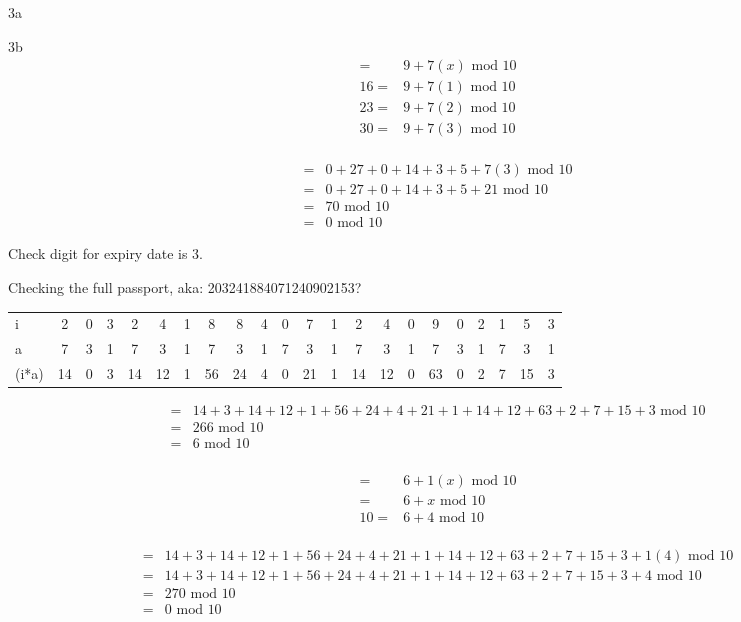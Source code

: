\begin{question}{3a}
\begin{question}{3b}
\begin{align*}
=& 9 + 7(x)\textrm{ mod } 10\\
16=& 9 + 7(1)\textrm{ mod } 10\\
23=& 9 + 7(2)\textrm{ mod } 10\\
30=& 9 + 7(3)\textrm{ mod } 10\\
\end{align*}

\begin{align*}
=& 0  + 27 + 0  + 14 + 3  + 5 +7(3) \textrm{ mod } 10\\
=& 0  + 27 + 0  + 14 + 3  + 5 + 21 \textrm{ mod } 10\\
=& 70 \textrm{ mod } 10\\
=& 0 \textrm{ mod } 10
\end{align*}

Check digit for expiry date is 3.



Checking the full passport, aka: 203241884071240902153?

\begin{tabular}{l|ccccccccccccccccccccc}
\hline
i     &  2  & 0  & 3  & 2  & 4  & 1  & 8  & 8  & 4  & 0  & 7  & 1  & 2  & 4  & 0  & 9  & 0  & 2  & 1  & 5  & 3 \\
a     & 7   & 3  & 1  & 7  & 3  & 1  & 7  & 3  & 1  & 7  & 3  & 1  & 7  & 3  & 1  & 7  & 3  & 1  & 7  & 3  & 1 \\
\hline
(i*a) & 14 & 0 & 3  & 14  & 12 & 1  & 56 & 24 & 4  & 0  & 21 & 1  & 14 & 12 & 0  & 63 & 0  & 2  & 7  & 15 & 3
\end{tabular}

\begin{align*}
=& 14  + 3   + 14   + 12  + 1   + 56  + 24  + 4   + 21  + 1   + 14  + 12  + 63  + 2   + 7   + 15  + 3 \textrm{ mod } 10\\
=& 266 \textrm{ mod } 10\\
=& 6 \textrm{ mod } 10\\
\end{align*}

\begin{align*}
=& 6 + 1(x)\textrm{ mod } 10\\
=& 6 + x\textrm{ mod } 10\\
10=& 6 + 4\textrm{ mod } 10\\
\end{align*}

\begin{align*}
=& 14  + 3   + 14   + 12  + 1   + 56  + 24  + 4   + 21  + 1   + 14  + 12  + 63  + 2   + 7   + 15  + 3 +1(4) \textrm{ mod } 10\\
=& 14  + 3   + 14   + 12  + 1   + 56  + 24  + 4   + 21  + 1   + 14  + 12  + 63  + 2   + 7   + 15  + 3 +4    \textrm{ mod } 10\\
=& 270 \textrm{ mod } 10\\
=& 0 \textrm{ mod } 10
\end{align*}


\end{question}
\end{question}
